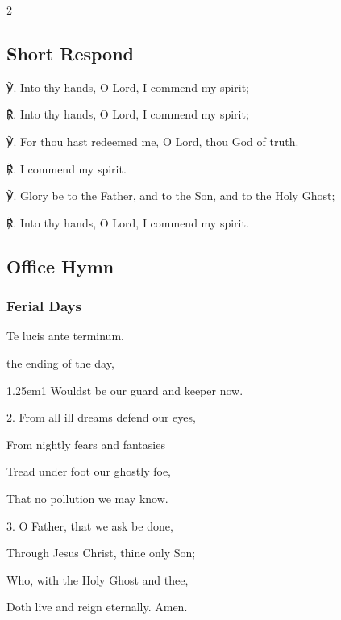 \begin{multicols}{2}

\subsection{Short Respond}
℣. Into thy hands, O Lord, I commend my spirit;

℟. Into thy hands, O Lord, I commend my spirit;

℣. For thou hast redeemed me, O Lord, thou God of truth.

℟. I commend my spirit.

℣. Glory be to the Father, and to the Son, and to the Holy Ghost;

℟. Into thy hands, O Lord, I commend my spirit.

\newcolumn

\subsection{Office Hymn}
\subsubsection{Ferial Days}
\begin{inhead}
	Te lucis ante terminum.
\end{inhead}
 the ending of the day,\par
{}
\par
\begin{hangparas}{1.25em}{1}
Wouldst be our guard and keeper now.\\
\par
2. From all ill dreams defend our eyes,\par
From nightly fears and fantasies\par
Tread under foot our ghostly foe,\par
That no pollution we may know.\\
\par
3. O Father, that we ask be done,\par
Through Jesus Christ, thine only Son;\par
Who, with the Holy Ghost and thee,\par
Doth live and reign eternally. Amen.
\end{hangparas}


\end{multicols}

